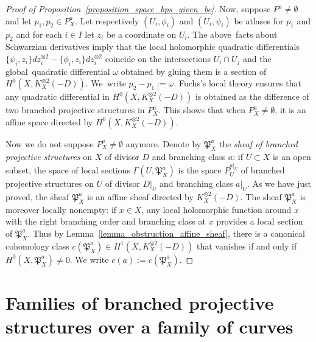 \documentclass[10pt]{amsart}
\theoremstyle{definition}
\theoremstyle{plain}
\begin{document}
\begin{proof}[Proof of Proposition~\ref{proposition_space_bps_given_bc}]
Now, suppose $P^a \!\neq\! \emptyset$ and let $p_1, p_2\!\in\! P_X^a$.
Let respectively $(U_i, \phi_i)$ and $(U_i, \psi_i)$ be atlases for $p_1$ and $p_2$ and for each $i \in I$ let $z_i$ be a coordinate on $U_i$.
The above~facts about Schwarzian derivatives imply that the local holomorphic \hbox{quadratic} \hbox{differentials} $\{\psi_i, z_i\}dz_i^{\otimes 2} \!-\! \{\phi_i, z_i\}dz_i^{\otimes 2}$ coincide on the intersections $U_i \cap U_j$ and the global~quadratic differential $\omega$ obtained by gluing them is a section of $H^0(X, K_X^{\otimes 2}(-D))$.
We~write $p_2-p_1:= \omega$. Fuchs's local theory ensures that any quadratic differential in $H^0(X, K_X^{\otimes 2}(-D))$ is obtained as the difference of two branched projective structures in $P_X^a$. This shows that when $P_X^a \neq \emptyset$, it is an affine space directed by $H^0(X, K_X^{\otimes 2}(-D))$.\enlargethispage{.5\baselineskip}%

Now we do not suppose $P_X^a \neq \emptyset$ anymore.
Denote by $\mathfrak P_X^a$ the \emph{sheaf of branched projective structures} on $X$ of divisor $D$ and branching class $a$: if $U \subset X$ is an open subset, the space of local sections $\Gamma\left(U, \mathfrak P_X^a\right)$ is the space $P_U^{a|_U}$ of branched projective structures on $U$ of divisor $D|_U$ and branching class $a|_U$.
As we have just proved, the sheaf $\mathfrak P_X^a$ is an affine sheaf directed by $K_X^{\otimes 2}(-D)$.
The sheaf $\mathfrak P_X^a$ is moreover locally nonempty: if $x \in X$, any local holomorphic function around $x$ with the right branching order and branching class at $x$ provides a local section of $\mathfrak P_X^a$.
Thus by Lemma~\ref{lemma_obstruction_affine_sheaf}, there is a canonical cohomology class $c\left(\mathfrak P_X^a\right) \in H^1\left(X, K_X^{\otimes 2}(-D)\right)$ that vanishes if and only if $H^0\left(X, \mathfrak P_X^a\right) \neq 0$.
We write $c(a):= c\left(\mathfrak P_X^a\right)$.
\end{proof}

\section{Families of branched projective structures over a family of curves}\label{section_families_branched_projective_structures}
\end{document}
